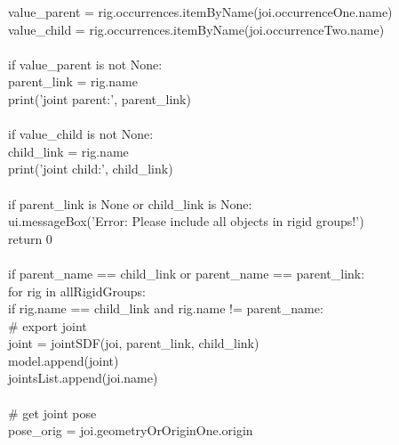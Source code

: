 {\hphantom{\quad\quad\quad\quad\quad}value\_parent = rig.occurrences.itemByName(joi.occurrenceOne.name)\\
\hphantom{\quad\quad\quad\quad\quad}value\_child = rig.occurrences.itemByName(joi.occurrenceTwo.name)\\
\\
\hphantom{\quad\quad\quad\quad\quad}if value\_parent is not None:\\
\hphantom{\quad\quad\quad\quad\quad\quad}parent\_link = rig.name\\
\hphantom{\quad\quad\quad\quad\quad\quad}print('joint parent:', parent\_link)\\
\\
\hphantom{\quad\quad\quad\quad\quad}if value\_child is not None:\\
\hphantom{\quad\quad\quad\quad\quad\quad}child\_link = rig.name\\
\hphantom{\quad\quad\quad\quad\quad\quad}print('joint child:', child\_link)\\
\\
\hphantom{\quad\quad\quad\quad}if parent\_link is None or child\_link is None:\\
\hphantom{\quad\quad\quad\quad\quad}ui.messageBox('Error: Please include all objects in rigid groups!')\\
\hphantom{\quad\quad\quad\quad\quad}return 0\\
\\
\hphantom{\quad\quad\quad\quad}if parent\_name == child\_link or parent\_name == parent\_link:\\
\hphantom{\quad\quad\quad\quad\quad}for rig in allRigidGroups:\\
\hphantom{\quad\quad\quad\quad\quad\quad}if rig.name == child\_link and rig.name != parent\_name:\\
\hphantom{\quad\quad\quad\quad\quad\quad\quad}\# export joint\\
\hphantom{\quad\quad\quad\quad\quad\quad\quad}joint = jointSDF(joi, parent\_link, child\_link)\\
\hphantom{\quad\quad\quad\quad\quad\quad\quad}model.append(joint)\\
\hphantom{\quad\quad\quad\quad\quad\quad\quad}jointsList.append(joi.name)\\
\\
\hphantom{\quad\quad\quad\quad\quad\quad\quad}\# get joint pose\\
\hphantom{\quad\quad\quad\quad\quad\quad\quad}pose\_orig = joi.geometryOrOriginOne.origin\\
}
